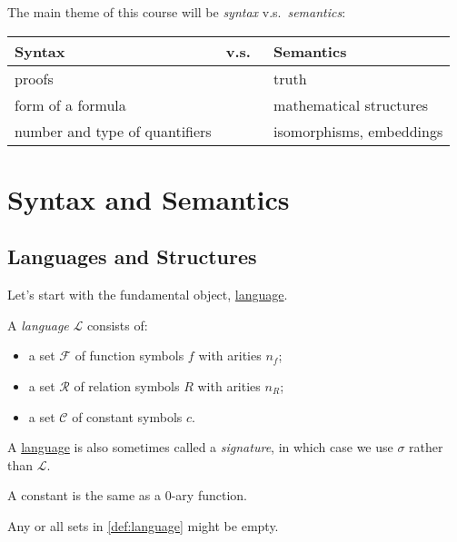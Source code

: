 The main theme of this course will be \emph{syntax} v.s.\ \emph{semantics}:
\begin{table}[H]
	\centering
	\begin{tabular}{lcl}
		\toprule
		Syntax                         & v.s.\  & Semantics                \\
		\midrule
		proofs                         &        & truth                    \\
		form of a formula              &        & mathematical structures  \\
		number and type of quantifiers &        & isomorphisms, embeddings \\
		\bottomrule
	\end{tabular}
\end{table}

\section{Syntax and Semantics}
\subsection{Languages and Structures}
Let's start with the fundamental object, \hyperref[def:language]{language}.

\begin{definition}[Language]\label{def:language}
	A \emph{language} \(\mathcal{L} \) consists of:
	\begin{itemize}
		\item a set \(\mathcal{F} \) of function symbols \(f\) with arities \(n_f\);
		\item a set \(\mathcal{R} \) of relation symbols \(R\) with arities \(n_R\);
		\item a set \(\mathcal{C} \) of constant symbols \(c\).
	\end{itemize}
\end{definition}

A \hyperref[def:language]{language} is also sometimes called a \emph{signature}, in which case we use \(\sigma \) rather than \(\mathcal{L} \).

\begin{note}
	A constant is the same as a \(0\)-ary function.
\end{note}

\begin{remark}
	Any or all sets in \autoref{def:language} might be empty.
\end{remark}

